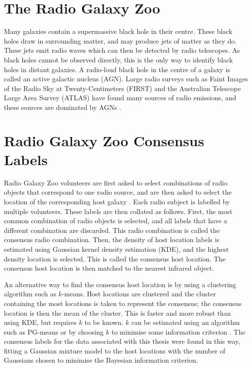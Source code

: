 \documentclass[11pt]{book}
\begin{document}
\section{The Radio Galaxy Zoo}
\label{sec:rgz}

    Many galaxies contain a supermassive black hole in their centre. These
    black holes draw in surrounding matter, and may produce jets of matter as
    they do. These jets emit radio waves  which can then be detected
    by radio telescopes. As black holes cannot be observed directly, this is
    the only way to identify black holes in distant galaxies. A radio-loud
    black hole in the centre of a galaxy is called an active galactic nucleus
    (AGN).  Large radio
    surveys such as Faint Images of the Radio Sky at Twenty-Centimeters (FIRST)
    \cite{white97, becker95} and the Australian Telescope Large Area Survey
    (ATLAS) \cite{franzen15} have found many sources of radio emissions, and
    these sources are dominated by AGNs \cite{banfield15}.

\section{Radio Galaxy Zoo Consensus Labels}
\label{sec:consensuses}
    
    Radio Galaxy Zoo volunteers are first asked to select combinations of radio
    objects that correspond to one radio source, and are then asked to select
    the location of the corresponding host galaxy \cite{banfield15}. Each radio
    subject is labelled by multiple volunteers. These labels are then collated
    as follows. First, the most common combination of radio objects is
    selected, and all labels that have a different combination are discarded.
    This radio combination is called the consensus radio combination. Then, the
    density of host location labels is estimated using Gaussian kernel density
    estimation (KDE), and the highest density location is selected. This is
    called the consensus host location. The consensus host location is then
    matched to the nearest infrared object.

    An alternative way to find the consensus host location is by using a
    clustering algorithm such as $k$-means. Host locations are clustered and
    the cluster containing the most locations is taken to represent the
    consensus; the consensus location is then the mean of the cluster. This is
    faster and more robust than using KDE, but requires $k$ to be known. $k$
    can be estimated using an algorithm such as PG-means \cite{hamerly07} or by
    choosing $k$ to minimise some information criterion .
    The consensus labels for the data associated with this thesis were found in
    this way, fitting a Gaussian mixture model to the host locations with the
    number of Gaussians chosen to minimise the Bayesian information criterion.
\end{document}
